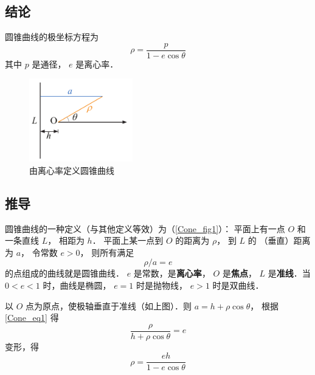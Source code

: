 

\subsection{结论}
圆锥曲线的极坐标方程为
\begin{equation}
\rho  = \frac{p}{{1 - e\cos \theta }}
\end{equation}
其中 $p$ 是通径， $e$ 是离心率．

\begin{figure}[ht]
\centering
\includegraphics[width=4.5cm]{./figures/Cone1.pdf}
\caption{由离心率定义圆锥曲线}\label{Cone_fig1}
\end{figure}

\subsection{推导}
圆锥曲线的一种定义（与其他定义等效）为（\autoref{Cone_fig1}）：
平面上有一点 $O$ 和一条直线 $L$， 相距为 $h$． 
平面上某一点到 $O$ 的距离为 $\rho $， 到 $L$ 的
（垂直）距离为 $a$， 令常数 $e > 0$， 则所有满足
\begin{equation}\label{Cone_eq1}
\rho/a = e
\end{equation}
的点组成的曲线就是圆锥曲线． $e$ 是常数，是\textbf{离心率}， $O$ 是\textbf{焦点}， $L$ 是\textbf{准线}．当 $0 < e < 1$ 时，曲线是椭圆， $e = 1$ 时是抛物线， $e > 1$ 时是双曲线．

以 $O$ 点为原点，使极轴垂直于准线（如上图）．则 $a = h + \rho \cos \theta $， 根据\autoref{Cone_eq1} 得
\begin{equation}\label{Cone_eq2}
\frac{\rho }{{h + \rho \cos \theta }} = e
\end{equation}
变形，得
\begin{equation}\label{Cone_eq3}
\rho  = \frac{{eh}}{{1 - e\cos \theta }}
\end{equation}



